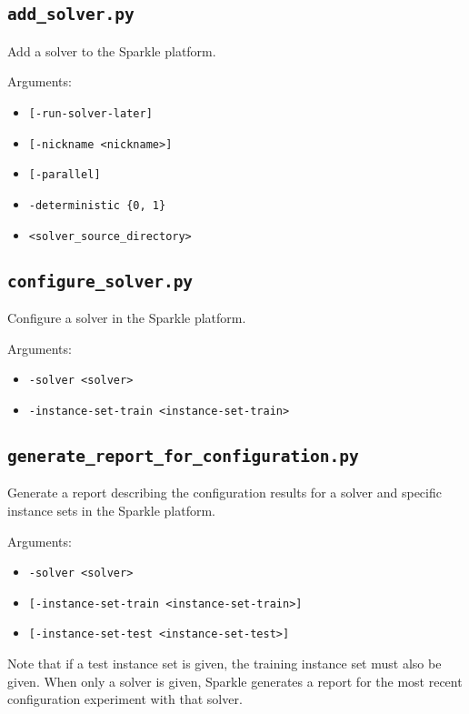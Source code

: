 \documentclass{article}
\begin{document}
\subsection{\texttt{add\_solver.py}}
\label{cmd:add_solver}
Add a solver to the Sparkle platform.

Arguments:
\begin{itemize}[noitemsep]
  \item[] \texttt{[-run-solver-later]}
  \item[] \texttt{[-nickname <nickname>]}
  \item[] \texttt{[-parallel]}
  \item[] \texttt{-deterministic \{0, 1\}}
  \item[] \texttt{<solver\_source\_directory>}
\end{itemize}

\subsection{\texttt{configure\_solver.py}}
\label{cmd:configure_solver}
Configure a solver in the Sparkle platform.

Arguments:
\begin{itemize}[noitemsep]
  \item[] \texttt{-solver <solver>}
  \item[] \texttt{-instance-set-train <instance-set-train>}
\end{itemize}

\subsection{\texttt{generate\_report\_for\_configuration.py}}
\label{cmd:generate_report_for_configuration}
Generate a report describing the configuration results for a solver and specific instance sets in the Sparkle platform.

Arguments:
\begin{itemize}[noitemsep]
  \item[] \texttt{-solver <solver>}
  \item[] \texttt{[-instance-set-train <instance-set-train>]}
  \item[] \texttt{[-instance-set-test <instance-set-test>]}
\end{itemize}

Note that if a test instance set is given, the training instance set must also be given. When only a solver is given, Sparkle generates a report for the most recent configuration experiment with that solver.
\end{document}
